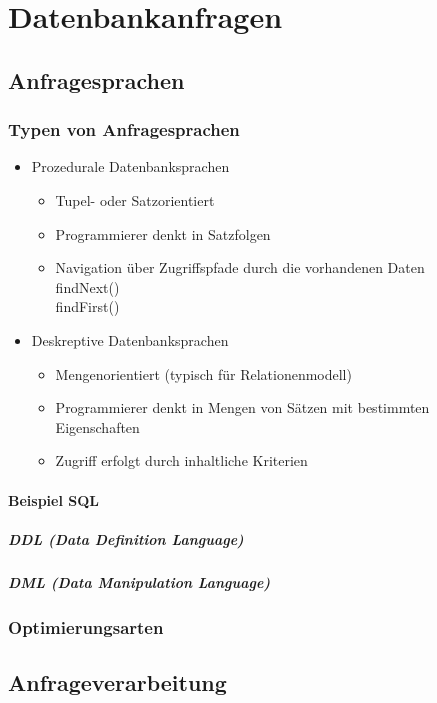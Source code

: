 \chapter{Datenbankanfragen}
	
\section{Anfragesprachen}
	\subsection{Typen von Anfragesprachen}
	\begin{itemize}
		\item Prozedurale Datenbanksprachen
		\begin{itemize}
			\item Tupel- oder Satzorientiert
			\item Programmierer denkt in Satzfolgen
			\item Navigation über Zugriffspfade durch die vorhandenen Daten\\findNext()\\findFirst()
		\end{itemize}
		\item Deskreptive Datenbanksprachen
		\begin{itemize}
			\item Mengenorientiert (typisch für Relationenmodell)
			\item Programmierer denkt in Mengen von Sätzen mit bestimmten Eigenschaften
			\item Zugriff erfolgt durch inhaltliche Kriterien
		\end{itemize}
	\end{itemize}
	
	\subsubsection{Beispiel SQL}
		\paragraph{DDL (Data Definition Language)}
		\paragraph{DML (Data Manipulation Language)}
	
	\subsection{Optimierungsarten}

\section{Anfrageverarbeitung}

